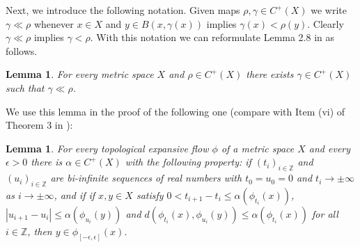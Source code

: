 \documentclass[11pt,letterpaper]{amsart}
\newtheorem{lemma}[thm]{Lemma}
\begin{document}
Next, we introduce the following notation.
Given maps \(\rho, \gamma\in C^+(X)\) we write $\gamma\ll\rho$ whenever
$x\in X$ and $y\in B(x,\gamma(x))$ implies $\gamma(x)<\rho(y)$.
Clearly $\gamma\ll\rho$ implies $\gamma<\rho$.
With this notation we can reformulate Lemma 2.8 in \cite{lny} as follows.

\begin{lemma}
\label{power}
For every metric space $X$ and $\rho\in C^+(X)$ there exists $\gamma\in C^+(X)$ such that $\gamma\ll\rho$.
\end{lemma}




We use this lemma in the proof of the following one (compare with Item (vi) of Theorem 3 in \cite{bw}):

\begin{lemma}
\label{p1}
For every topological expansive flow $\phi$ of a metric space $X$
and every $\epsilon>0$ there is $\alpha\in C^+(X)$ with the following property:
if $(t_i)_{i\in\mathbb{Z}}$ and $(u_i)_{i\in\mathbb{Z}}$ are bi-infinite sequences of real numbers with $t_0=u_0=0$ and $t_i\to\pm\infty$ as $i\to\pm\infty$, and if
if $x,y\in X$ satisfy
$0<t_{i+1}-t_i\leq\alpha(\phi_{t_i}(x))$, $|u_{i+1}-u_i|\leq\alpha(\phi_{u_i}(y))$ and 
$d(\phi_{t_i}(x),\phi_{u_i}(y))\leq\alpha(\phi_{t_i}(x))$ for all $i\in\mathbb{Z}$,
then $y\in \phi_{[-\epsilon,\epsilon]}(x)$.
\end{lemma}
\end{document}
